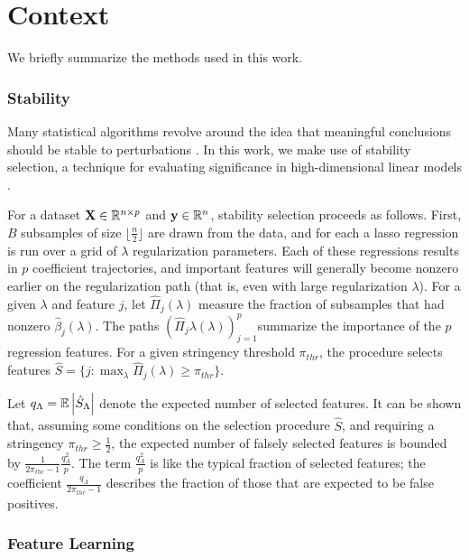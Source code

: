 
\section{Context}

We briefly summarize the methods used in this work.


\subsubsection{Stability}

Many statistical algorithms revolve around the idea that meaningful conclusions should be stable to perturbations \cite{yu2013stability}. In this work, we make use of stability selection, a technique for evaluating significance in high-dimensional linear models \cite{meinshausen2010stability}.

For a dataset $\mathbf{X}\in \mathbb{R}^{n \times p}$ and $\mathbf{y} \in
\mathbb{R}^{n}$, stability selection proceeds as follows. First, $B$ subsamples of
size $\lfloor \frac{n}{2} \rfloor$ are drawn from the data, and for each a lasso
regression is run over a grid of $\lambda$ regularization parameters. Each of
these regressions results in $p$ coefficient trajectories, and important
features will generally become nonzero earlier on the regularization path (that
is, even with large regularization $\lambda$). For a given $\lambda$ and feature
$j$, let $\hat{\Pi}_{j}\left(\lambda\right)$ measure the fraction of subsamples
that had nonzero $\hat{\beta}_j\left(\lambda\right)$. The paths
$\left(\hat{\Pi}_{j}\lambda\left(\lambda\right)\right)_{j = 1}^{p}$summarize the
importance of the $p$ regression features. For a given stringency threshold
$\pi_{thr}$, the procedure selects features $\hat{S} = \{j : \max_{\lambda}
\hat{\Pi}_{j}\left(\lambda\right) \geq \pi_{thr}\}$.

Let $q_{\Lambda} = \mathbb{E}\left|{\hat{S}_{\Lambda}}\right|$ denote the expected number of
selected features. It can be shown that, assuming some conditions on the
selection procedure $\hat{S}$, and requiring a stringency $\pi_{thr} \geq
\frac{1}{2}$, the expected number of falsely selected features is bounded by
$\frac{1}{2\pi_{thr} - 1} \frac{q_{\Lambda}^2}{p}$. The term
$\frac{q_{\Lambda}^2}{p}$ is like the typical fraction of selected features; the
coefficient $\frac{q_{\Lambda}}{2\pi_{thr} - 1}$ describes the fraction of those
that are expected to be false positives.

\subsubsection{Feature Learning}

